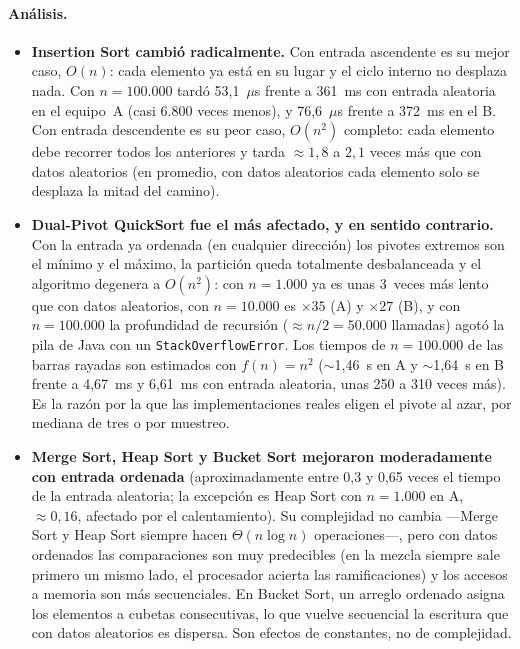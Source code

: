\documentclass[11pt,a4paper]{article}
\newcommand{\code}[1]{\texttt{#1}}
\begin{document}
\paragraph{An\'alisis.}
\begin{itemize}
  \item \textbf{Insertion Sort cambi\'o radicalmente.} Con entrada ascendente es su mejor caso, $O(n)$: cada
  elemento ya est\'a en su lugar y el ciclo interno no desplaza nada. Con $n=100.000$ tard\'o 53,1~$\mu$s frente
  a 361~ms con entrada aleatoria en el equipo~A (casi 6.800 veces menos), y 76,6~$\mu$s frente a 372~ms en el
  B. Con entrada descendente es su peor caso, $O(n^2)$ completo: cada elemento debe recorrer todos los anteriores
  y tarda $\approx1{,}8$ a $2{,}1$ veces m\'as que con datos aleatorios (en promedio, con datos aleatorios cada
  elemento solo se desplaza la mitad del camino).
  \item \textbf{Dual-Pivot QuickSort fue el m\'as afectado, y en sentido contrario.} Con la entrada ya ordenada
  (en cualquier direcci\'on) los pivotes extremos son el m\'inimo y el m\'aximo, la partici\'on queda
  totalmente desbalanceada y el algoritmo degenera a $O(n^2)$: con $n=1.000$ ya es unas 3~veces m\'as lento que
  con datos aleatorios, con $n=10.000$ es $\times35$ (A) y $\times27$ (B), y con $n=100.000$ la profundidad
  de recursi\'on ($\approx n/2=50.000$ llamadas) agot\'o la pila de Java con un \code{StackOverflowError}. Los
  tiempos de $n=100.000$ de las barras rayadas son estimados con $f(n)=n^2$ ($\sim$1,46~s en A y $\sim$1,64~s
  en B frente a 4,67~ms y 6,61~ms con entrada aleatoria, unas 250 a 310 veces m\'as). Es la raz\'on por la que
  las implementaciones reales eligen el pivote al azar, por mediana de tres o por muestreo.
  \item \textbf{Merge Sort, Heap Sort y Bucket Sort mejoraron moderadamente con entrada ordenada}
  (aproximadamente entre 0,3 y 0,65 veces el tiempo de la entrada aleatoria; la excepci\'on es Heap Sort con
  $n=1.000$ en A, $\approx0{,}16$, afectado por el calentamiento). Su complejidad no cambia ---Merge
  Sort y Heap Sort siempre hacen $\Theta(n\log n)$ operaciones---, pero con datos ordenados las comparaciones
  son muy predecibles (en la mezcla siempre sale primero un mismo lado, el procesador acierta las
  ramificaciones) y los accesos a memoria son m\'as secuenciales. En Bucket Sort, un arreglo ordenado asigna
  los elementos a cubetas consecutivas, lo que vuelve secuencial la escritura que con datos aleatorios es
  dispersa. Son efectos de constantes, no de complejidad.

\end{itemize}
\end{document}

